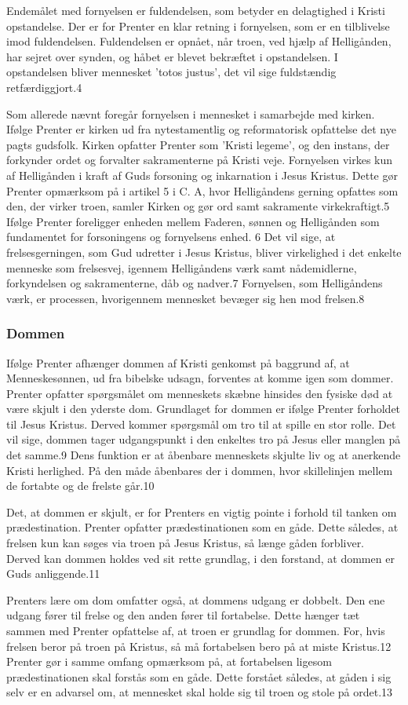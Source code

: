 Endemålet med fornyelsen er fuldendelsen, som betyder en delagtighed i Kristi opstandelse. Der er for Prenter en klar retning i fornyelsen, som er en tilblivelse imod fuldendelsen. Fuldendelsen er opnået, når troen, ved hjælp af Helligånden, har sejret over synden, og håbet er blevet bekræftet i opstandelsen. I opstandelsen bliver mennesket 'totos justus', det vil sige fuldstændig retfærdiggjort.4

Som allerede nævnt foregår fornyelsen i mennesket i samarbejde med kirken. Ifølge Prenter er kirken ud fra nytestamentlig og reformatorisk opfattelse det nye pagts gudsfolk. Kirken opfatter Prenter som 'Kristi legeme', og den instans, der forkynder ordet og forvalter sakramenterne på Kristi veje. Fornyelsen virkes kun af Helligånden i kraft af Guds forsoning og inkarnation i Jesus Kristus. Dette gør Prenter opmærksom på i artikel 5 i C. A, hvor Helligåndens gerning opfattes som den, der virker troen, samler Kirken og gør ord samt sakramente virkekraftigt.5 Ifølge Prenter foreligger enheden mellem Faderen, sønnen og Helligånden som fundamentet for forsoningens og fornyelsens enhed. 6 Det vil sige, at frelsesgerningen, som Gud udretter i Jesus Kristus, bliver virkelighed i det enkelte menneske som frelsesvej, igennem Helligåndens værk samt nådemidlerne, forkyndelsen og sakramenterne, dåb og nadver.7 Fornyelsen, som Helligåndens værk, er processen, hvorigennem mennesket bevæger sig hen mod frelsen.8

\subsubsection{Dommen}
Ifølge Prenter afhænger dommen af Kristi genkomst på baggrund af, at Menneskesønnen, ud fra bibelske
udsagn, forventes at komme igen som dommer. Prenter opfatter spørgsmålet om menneskets skæbne hinsides
den fysiske død at være skjult i den yderste dom. Grundlaget for dommen er ifølge Prenter forholdet til
Jesus Kristus. Derved kommer spørgsmål om tro til at spille en stor rolle. Det vil sige, dommen tager udgangspunkt i den enkeltes tro på Jesus eller manglen på det samme.9 Dens funktion er at åbenbare menneskets skjulte liv og at anerkende Kristi herlighed. På den måde åbenbares der i dommen, hvor skillelinjen mellem de fortabte og de frelste går.10

Det, at dommen er skjult, er for Prenters en vigtig pointe i forhold til tanken om prædestination. Prenter opfatter prædestinationen som en gåde. Dette således, at frelsen kun kan søges via troen på Jesus Kristus, så længe gåden forbliver. Derved kan dommen holdes ved sit rette grundlag, i den forstand, at dommen er Guds anliggende.11

Prenters lære om dom omfatter også, at dommens udgang er dobbelt. Den ene udgang fører til frelse og den anden fører til fortabelse. Dette hænger tæt sammen med Prenter opfattelse af, at troen er grundlag for dommen. For, hvis frelsen beror på troen på Kristus, så må fortabelsen bero på at miste Kristus.12 Prenter gør i samme omfang opmærksom på, at fortabelsen ligesom prædestinationen skal forstås som en gåde. Dette forstået således, at gåden i sig selv er en advarsel om, at mennesket skal holde sig til troen og stole på ordet.13